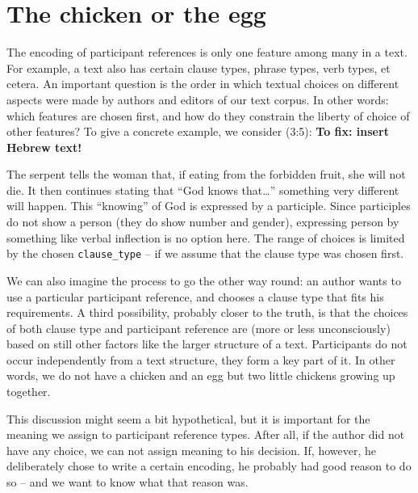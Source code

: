 \documentclass{report}
\newcommand{\mi}[1]{\lstinline{#1}}
\begin{document}
\section{The chicken or the egg}
The encoding of participant references is only one feature among many in a text. For example, a text also has certain clause types, phrase types, verb types, et cetera.
An important question is the order in which textual choices on different aspects were made by authors and editors of our text corpus. In other words: which features are chosen first, and how do they constrain the liberty of choice of other features?
To give a concrete example, we consider (3:5): \textbf{To fix: insert Hebrew text!}

The serpent tells the woman that, if eating from the forbidden fruit, she will not die. It then continues stating that ``God knows that\ldots'' something very different will happen. This ``knowing'' of God is expressed by a participle. Since participles do not show a person (they do show number and gender), expressing person by something like verbal inflection is no option here. The range of choices is limited by the chosen \mi{clause_type} -- if we assume that the clause type was chosen first.

We can also imagine the process to go the other way round: an author wants to use a particular participant reference, and chooses a clause type that fits his requirements.
A third possibility, probably closer to the truth, is that the choices of both clause type and participant reference are (more or less unconsciously) based on still other factors like the larger structure of a text. Participants do not occur independently from a text structure, they form a key part of it. In other words, we do not have a chicken and an egg but two little chickens growing up together.

This discussion might seem a bit hypothetical, but it is important for the meaning we assign to participant reference types. After all, if the author did not have any choice, we can not assign meaning to his decision. If, however, he deliberately chose to write a certain encoding, he probably had good reason to do so -- and we want to know what that reason was.
\end{document}
